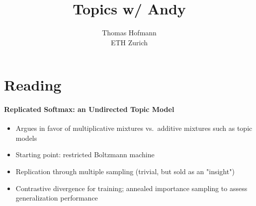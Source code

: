 \documentclass{article}
\title{Topics w/ Andy}
\author{Thomas Hofmann\\ ETH Zurich}
\begin{document}
\maketitle

\section{Reading}

\paragraph*{Replicated Softmax: an Undirected Topic Model \cite{hinton2009replicated}}
\begin{itemize}
\item  Argues in favor of multiplicative mixtures vs.~additive mixtures such as topic models
\item Starting point: restricted Boltzmann machine 
\item Replication through multiple sampling (trivial, but sold as an "insight") 
\item Contrastive divergence for training; annealed importance sampling to assess generalization performance 
\end{itemize}



\end{document}
